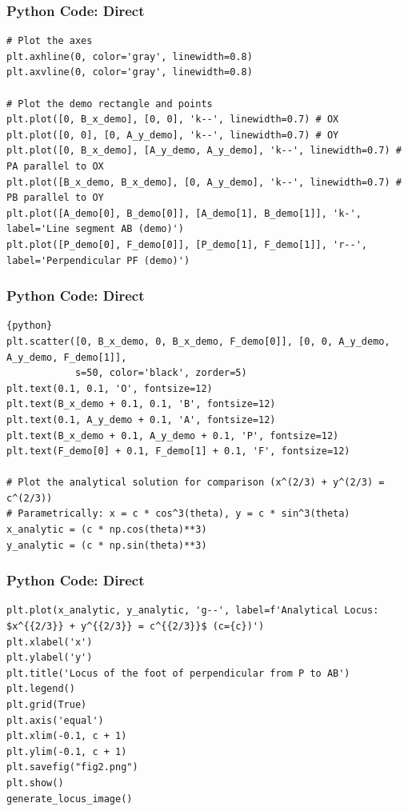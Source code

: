 \documentclass{beamer}
\begin{document}
\begin{frame}[fragile]
\frametitle{Python Code: Direct}
\begin{lstlisting}
# Plot the axes
plt.axhline(0, color='gray', linewidth=0.8)
plt.axvline(0, color='gray', linewidth=0.8)

# Plot the demo rectangle and points
plt.plot([0, B_x_demo], [0, 0], 'k--', linewidth=0.7) # OX
plt.plot([0, 0], [0, A_y_demo], 'k--', linewidth=0.7) # OY
plt.plot([0, B_x_demo], [A_y_demo, A_y_demo], 'k--', linewidth=0.7) # PA parallel to OX
plt.plot([B_x_demo, B_x_demo], [0, A_y_demo], 'k--', linewidth=0.7) # PB parallel to OY
plt.plot([A_demo[0], B_demo[0]], [A_demo[1], B_demo[1]], 'k-', label='Line segment AB (demo)')
plt.plot([P_demo[0], F_demo[0]], [P_demo[1], F_demo[1]], 'r--', label='Perpendicular PF (demo)')
\end{lstlisting}
\end{frame}

\begin{frame}[fragile]
\frametitle{Python Code: Direct}
\begin{lstlisting}{python}
plt.scatter([0, B_x_demo, 0, B_x_demo, F_demo[0]], [0, 0, A_y_demo, A_y_demo, F_demo[1]],
            s=50, color='black', zorder=5)
plt.text(0.1, 0.1, 'O', fontsize=12)
plt.text(B_x_demo + 0.1, 0.1, 'B', fontsize=12)
plt.text(0.1, A_y_demo + 0.1, 'A', fontsize=12)
plt.text(B_x_demo + 0.1, A_y_demo + 0.1, 'P', fontsize=12)
plt.text(F_demo[0] + 0.1, F_demo[1] + 0.1, 'F', fontsize=12)

# Plot the analytical solution for comparison (x^(2/3) + y^(2/3) = c^(2/3))
# Parametrically: x = c * cos^3(theta), y = c * sin^3(theta)
x_analytic = (c * np.cos(theta)**3)
y_analytic = (c * np.sin(theta)**3)
\end{lstlisting}
\end{frame}

\begin{frame}[fragile]
\frametitle{Python Code: Direct}
\begin{lstlisting}
plt.plot(x_analytic, y_analytic, 'g--', label=f'Analytical Locus: $x^{{2/3}} + y^{{2/3}} = c^{{2/3}}$ (c={c})')
plt.xlabel('x')
plt.ylabel('y')
plt.title('Locus of the foot of perpendicular from P to AB')
plt.legend()
plt.grid(True)
plt.axis('equal')
plt.xlim(-0.1, c + 1)
plt.ylim(-0.1, c + 1)
plt.savefig("fig2.png")
plt.show()
generate_locus_image()
\end{lstlisting}
\end{frame}
\end{document}
